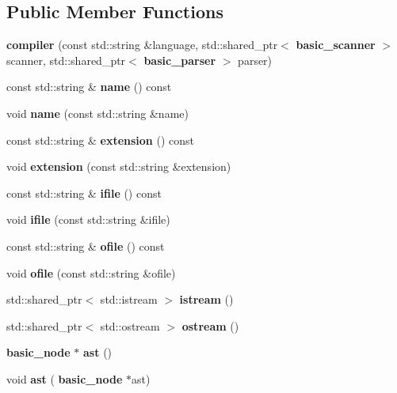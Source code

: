 \subsection*{Public Member Functions}
\begin{DoxyCompactItemize}
\item 
\mbox{\label{classcdk_1_1compiler_a0718890212e30c490d31158ea8d75f73}} 
{\bfseries compiler} (const std\+::string \&language, std\+::shared\+\_\+ptr$<$ \textbf{ basic\+\_\+scanner} $>$ scanner, std\+::shared\+\_\+ptr$<$ \textbf{ basic\+\_\+parser} $>$ parser)
\item 
\mbox{\label{classcdk_1_1compiler_a60a0cacc896d803ab6d846f10befe3a5}} 
const std\+::string \& {\bfseries name} () const
\item 
\mbox{\label{classcdk_1_1compiler_a933cbe2e866df6bcf976f3b2bca53873}} 
void {\bfseries name} (const std\+::string \&name)
\item 
\mbox{\label{classcdk_1_1compiler_a555e4bbb1dbac31eaff757d66615e97c}} 
const std\+::string \& {\bfseries extension} () const
\item 
\mbox{\label{classcdk_1_1compiler_a944e52a202d89b3ba19988eacdc617b2}} 
void {\bfseries extension} (const std\+::string \&extension)
\item 
\mbox{\label{classcdk_1_1compiler_a16f6a81921fc6aab73e7fefa44b3683e}} 
const std\+::string \& {\bfseries ifile} () const
\item 
\mbox{\label{classcdk_1_1compiler_ac7a952f66fed4125e3054b5c7592ddb1}} 
void {\bfseries ifile} (const std\+::string \&ifile)
\item 
\mbox{\label{classcdk_1_1compiler_a248dc1890a92c5f68aaba29dc1ffca14}} 
const std\+::string \& {\bfseries ofile} () const
\item 
\mbox{\label{classcdk_1_1compiler_a2077beaf9b1bc9d087830d609a397de5}} 
void {\bfseries ofile} (const std\+::string \&ofile)
\item 
\mbox{\label{classcdk_1_1compiler_ae7cf9a49176b0ab9239f0c4d2e5b1668}} 
std\+::shared\+\_\+ptr$<$ std\+::istream $>$ {\bfseries istream} ()
\item 
\mbox{\label{classcdk_1_1compiler_a36a108cb45b06e37eca6dfc4075784fa}} 
std\+::shared\+\_\+ptr$<$ std\+::ostream $>$ {\bfseries ostream} ()
\item 
\mbox{\label{classcdk_1_1compiler_ae95606d4deb9e5be056685b1f634d10f}} 
\textbf{ basic\+\_\+node} $\ast$ {\bfseries ast} ()
\item 
\mbox{\label{classcdk_1_1compiler_a841837c96b96d9c59532e57982011dc0}} 
void {\bfseries ast} (\textbf{ basic\+\_\+node} $\ast$ast)

\end{DoxyCompactItemize}
